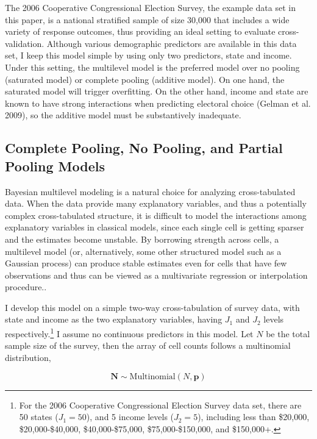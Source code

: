The 2006 Cooperative Congressional Election Survey, the example data set
in this paper, is a national stratified sample of size 30,000 that
includes a wide variety of response outcomes, thus providing an ideal
setting to evaluate cross-validation. Although various demographic
predictors are available in this data set, I keep this model simple by
using only two predictors, state and income. Under this setting, the
multilevel model is the preferred model over no pooling (saturated
model) or complete pooling (additive model). On one hand, the saturated
model will trigger overfitting. On the other hand, income and state are
known to have strong interactions when predicting electoral choice
(Gelman et al. 2009), so the additive model must be substantively
inadequate.

\subsection{Complete Pooling, No Pooling, and Partial Pooling
Models}\label{complete-pooling-no-pooling-and-partial-pooling-models}

Bayesian multilevel modeling is a natural choice for analyzing
cross-tabulated data. When the data provide many explanatory variables,
and thus a potentially complex cross-tabulated structure, it is
difficult to model the interactions among explanatory variables in
classical models, since each single cell is getting sparser and the
estimates become unstable. By borrowing strength across cells, a
multilevel model (or, alternatively, some other structured model such as
a Gaussian process) can produce stable estimates even for cells that
have few observations and thus can be viewed as a multivariate
regression or interpolation procedure..

I develop this model on a simple two-way cross-tabulation of survey
data, with state and income as the two explanatory variables, having
\(J_1\) and \(J_2\) levels
respectively.\footnote{For the 2006 Cooperative Congressional Election Survey
  data set, there are 50 states ($J_1=50$), and 5 income levels ($J_2=5$),
  including less than \$20,000, \$20,000-\$40,000, \$40,000-\$75,000,
  \$75,000-\$150,000, and \$150,000+.} I assume no continuous predictors
in this model. Let \(N\) be the total sample size of the survey, then
the array of cell counts follows a multinomial distribution,

\begin{equation*}\bm{N}\sim \text{Multinomial}(N, \bm{p})\end{equation*}

